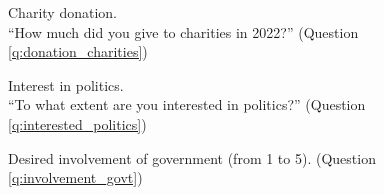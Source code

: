 \begin{figure}[h!]
    \caption[Charity donation]{Charity donation. \\ ``How much did you give to charities in 2022?'' (Question \ref{q:donation_charities})}\label{fig:donation_charities}
\end{figure}

\begin{figure}[h!] 
    \caption[Interest in politics]{Interest in politics. \\ ``To what extent are you interested in politics?'' (Question \ref{q:interested_politics})}\label{fig:interested_politics}
\end{figure}

\begin{figure}[h!] 
    \caption[Desired involvement of government]{Desired involvement of government (from 1 to 5). (Question \ref{q:involvement_govt})}\label{fig:involvement_govt}
\end{figure}

